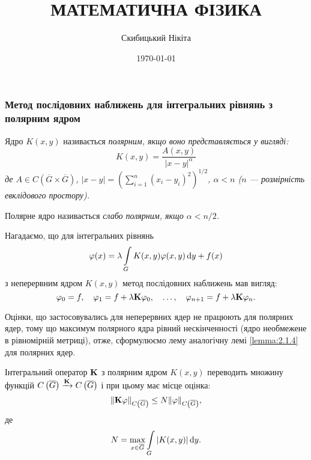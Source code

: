 

 \title{{\Huge МАТЕМАТИЧНА ФІЗИКА}}
 \author{Скибицький Нікіта}
 \date{\today}

 



 \tableofcontents

 \setcounter{section}{2}
 \setcounter{subsection}{1}
 \setcounter{subsubsection}{4}
 \setcounter{equation}{39}

\subsubsection{Метод послідовних наближень для інтегральних рівнянь з полярним ядром}

\begin{definition}
	Ядро $K(x, y)$ називається \it{полярним}, якщо воно представляється у вигляді:
	\begin{equation}
		K(x, y) = \dfrac{A(x, y)}{|x - y|^\alpha}
	\end{equation}
	де $A \in C\left(\overline G \times \overline G\right)$, $|x - y| = \left( \sum_{i = 1}^n (x_i - y_i)^2 \right)^{1/2}$, $\alpha < n$ ($n$ --- розмірність евклідового простору).
\end{definition}

\begin{definition}
	Полярне ядро називається \it{слабо полярним}, якщо $\alpha < n / 2$.
\end{definition}

Нагадаємо, що для інтегральних рівнянь 
\begin{equation}
	\phi(x) = \lambda \Int_G K(x, y) \phi(x, y) \diff y + f(x)
\end{equation}
з неперервним ядром $K(x, y)$ метод послідовних наближень мав вигляд: 
\begin{equation}
	\phi_0 = f, \quad \phi_1 = f + \lambda \bf{K} \phi_0, \quad \ldots, \quad \phi_{n + 1} = f + \lambda \bf{K} \phi_n.
\end{equation}	

Оцінки, що застосовувались для неперервних ядер не працюють для полярних ядер, тому що максимум полярного ядра рівний нескінченності (ядро необмежене в рівномірній метриці), отже, сформулюємо лему аналогічну лемі \ref{lemma:2.1.4} для полярних ядер. 

\begin{lemma}
	Інтегральний оператор $\bf{K}$ з полярним ядром $K(x, y)$ переводить множину функцій $C\left(\overline G\right) \xrightarrow{\bf{K}} C \left(\overline G\right)$ і при цьому має місце оцінка: 
	\begin{equation}
		\| \bf{K} \phi \|_{C\left(\overline G\right)} \le N \| \phi\|_{C\left(\overline G\right)},
	\end{equation}
	де 
	\begin{equation}
		N = \Max_{x \in \overline G} \Int_G |K(x, y)| \diff y.
	\end{equation}
\end{lemma}

